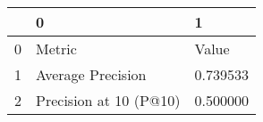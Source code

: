 \begin{tabular}{lll}
\toprule
 & 0 & 1 \\
\midrule
0 & Metric & Value \\
1 & Average Precision & 0.739533 \\
2 & Precision at 10 (P@10) & 0.500000 \\
\bottomrule
\end{tabular}
